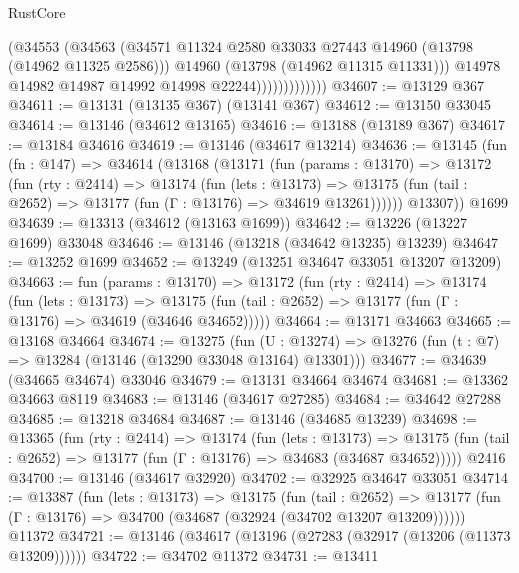 \begin{lexlean}{RustCore}
\begin{coremodule}
                            (@34553
                              (@34563
                                (@34571
                                  @11324
                                  @2580
                                  @33033
                                  @27443
                                  @14960
                                  (@13798 (@14962 @11325 @2586)))
                                @14960
                                (@13798 (@14962 @11315 @11331)))
                              @14978
                              @14982
                              @14987
                              @14992
                              @14998
                              @22244)))))))))))))
@34607 := @13129 @367
@34611 := @13131 (@13135 @367) (@13141 @367)
@34612 := @13150 @33045
@34614 := @13146 (@34612 @13165)
@34616 := @13188 (@13189 @367)
@34617 := @13184 @34616
@34619 := @13146 (@34617 @13214)
@34636 := @13145
    (fun (fn : @147) =>
    @34614
      (@13168
        (@13171
          (fun (params : @13170) =>
          @13172
            (fun (rty : @2414) =>
            @13174
              (fun (lets : @13173) =>
              @13175 (fun (tail : @2652) => @13177 (fun (Γ : @13176) => @34619 @13261))))))
        @13307))
    @1699
@34639 := @13313 (@34612 (@13163 @1699))
@34642 := @13226 (@13227 @1699) @33048
@34646 := @13146 (@13218 (@34642 @13235) @13239)
@34647 := @13252 @1699
@34652 := @13249 (@13251 @34647 @33051 @13207 @13209)
@34663 := fun (params : @13170) =>
  @13172
    (fun (rty : @2414) =>
    @13174
      (fun (lets : @13173) =>
      @13175 (fun (tail : @2652) => @13177 (fun (Γ : @13176) => @34619 (@34646 @34652)))))
@34664 := @13171 @34663
@34665 := @13168 @34664
@34674 := @13275
    (fun (U : @13274) => @13276 (fun (t : @7) => @13284 (@13146 (@13290 @33048 @13164) @13301)))
@34677 := @34639 (@34665 @34674) @33046
@34679 := @13131 @34664 @34674
@34681 := @13362 @34663 @8119
@34683 := @13146 (@34617 @27285)
@34684 := @34642 @27288
@34685 := @13218 @34684
@34687 := @13146 (@34685 @13239)
@34698 := @13365
    (fun (rty : @2414) =>
    @13174
      (fun (lets : @13173) =>
      @13175 (fun (tail : @2652) => @13177 (fun (Γ : @13176) => @34683 (@34687 @34652)))))
    @2416
@34700 := @13146 (@34617 @32920)
@34702 := @32925 @34647 @33051
@34714 := @13387
    (fun (lets : @13173) =>
    @13175
      (fun (tail : @2652) =>
      @13177 (fun (Γ : @13176) => @34700 (@34687 (@32924 (@34702 @13207 @13209))))))
    @11372
@34721 := @13146 (@34617 (@13196 (@27283 (@32917 (@13206 (@11373 @13209))))))
@34722 := @34702 @11372
@34731 := @13411

\end{coremodule}
\end{lexlean}
